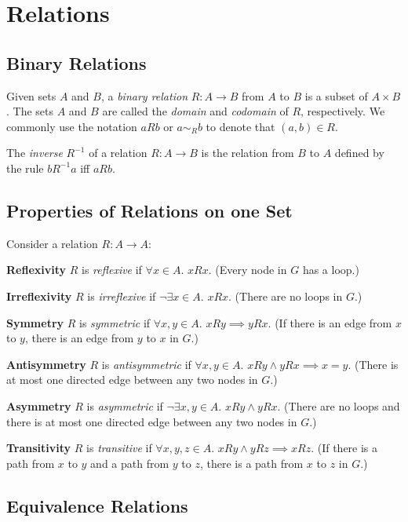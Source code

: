 \documentclass[../main.tex]{subfiles}
\begin{document}
\section{Relations}

\subsection{Binary Relations}

Given sets $A$ and $B$, a \textit{binary relation} $R : A \to B$ from $A$
to $B$ is a subset of $A \times B$. The sets $A$ and $B$ are called the \textit{domain} and \textit{codomain} of $R$, respectively. We commonly use the notation $aRb$ or $a \sim _R b$ to denote that $(a,b) \in R$.

The \textit{inverse} $R^{-1}$ of a relation $R : A \to B$ is the relation from $B$ to $A$ defined by the rule $bR^{-1}a$ iff $aRb$.

\subsection{Properties of Relations on one Set}

Consider a relation $R : A \to A$:

\textbf{Reflexivity} $R$ is \textit{reflexive} if $\forall x \in A$. $xRx$. (Every node in $G$ has a loop.)

\textbf{Irreflexivity} $R$ is \textit{irreflexive} if $\neg\exists x \in A$. $xRx$. (There are no loops in $G$.)

\textbf{Symmetry} $R$ is \textit{symmetric} if $\forall x, y \in A$. $xRy \implies yRx$. (If there is an edge from $x$ to $y$, there is an edge from $y$ to $x$ in $G$.)

\textbf{Antisymmetry} $R$ is \textit{antisymmetric} if $\forall x, y \in A$. $xRy \land yRx \implies x = y$. (There is at most one directed edge between any two nodes in $G$.)

\textbf{Asymmetry} $R$ is \textit{asymmetric} if $\neg\exists x, y \in A$. $xRy \land  yRx$. (There are no loops and there is at most one directed edge between any two nodes in $G$.)

\textbf{Transitivity} $R$ is \textit{transitive} if $\forall x, y, z \in A$. $xRy \land yRz \implies xRz$. (If there is a path from $x$ to $y$ and a path from $y$ to $z$, there is a path from $x$ to $z$ in $G$.)

\subsection{Equivalence Relations}
\end{document}
